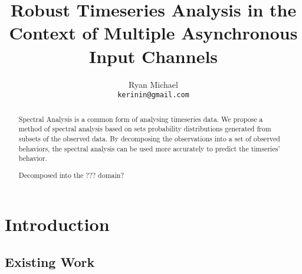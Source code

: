 \documentclass[10pt]{article}
\begin{document}
\title{Robust Timeseries Analysis in the Context of Multiple Asynchronous Input Channels}
\author{Ryan Michael\\ \texttt{kerinin@gmail.com}}
\maketitle

\begin{abstract}
Spectral Analysis is a common form of analysing timeseries data.  We propose a method of spectral analysis based on sets probability distributions generated from subsets of the observed data.  By decomposing the observations into a set of observed behaviors, the spectral analysis can be used more accurately to predict the timseries' behavior.

Decomposed into the ??? domain?
\end{abstract}

\section{Introduction}

\subsection{Existing Work}


\end{document}
